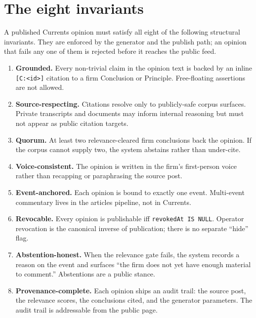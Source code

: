 \documentclass[11pt]{article}
\begin{document}
\section{The eight invariants}

A published Currents opinion must satisfy all eight of the following
structural invariants. They are enforced by the generator and the
publish path; an opinion that fails any one of them is rejected
before it reaches the public feed.

\begin{enumerate}[leftmargin=*,itemsep=0.3em]
  \item \textbf{Grounded.} Every non-trivial claim in the opinion
        text is backed by an inline \texttt{[C:<id>]} citation to a
        firm Conclusion or Principle. Free-floating assertions are
        not allowed.
  \item \textbf{Source-respecting.} Citations resolve only to
        publicly-safe corpus surfaces. Private transcripts and
        documents may inform internal reasoning but must not appear
        as public citation targets.
  \item \textbf{Quorum.} At least two relevance-cleared firm
        conclusions back the opinion. If the corpus cannot supply
        two, the system abstains rather than under-cite.
  \item \textbf{Voice-consistent.} The opinion is written in the
        firm's first-person voice rather than recapping or
        paraphrasing the source post.
  \item \textbf{Event-anchored.} Each opinion is bound to exactly one
        event. Multi-event commentary lives in the articles pipeline,
        not in Currents.
  \item \textbf{Revocable.} Every opinion is publishable iff
        \texttt{revokedAt IS NULL}. Operator revocation is the
        canonical inverse of publication; there is no separate
        ``hide'' flag.
  \item \textbf{Abstention-honest.} When the relevance gate fails,
        the system records a reason on the event and surfaces ``the
        firm does not yet have enough material to comment.''
        Abstentions are a public stance.
  \item \textbf{Provenance-complete.} Each opinion ships an audit
        trail: the source post, the relevance scores, the conclusions
        cited, and the generator parameters. The audit trail is
        addressable from the public page.
\end{enumerate}
\end{document}
